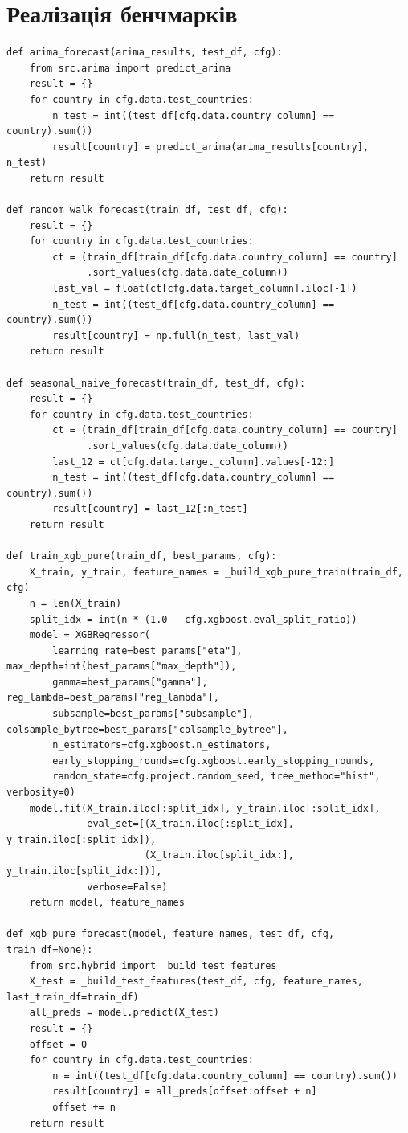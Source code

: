 \documentclass{bachelor_thesis}
\begin{document}
\section{Реалізація бенчмарків}
\label{sec:appendix_benchmarks}
\begin{lstlisting}[caption={Прогнози бенчмарків: випадкове блукання, сезонна наїва модель, XGBoost}]
def arima_forecast(arima_results, test_df, cfg):
    from src.arima import predict_arima
    result = {}
    for country in cfg.data.test_countries:
        n_test = int((test_df[cfg.data.country_column] == country).sum())
        result[country] = predict_arima(arima_results[country], n_test)
    return result

def random_walk_forecast(train_df, test_df, cfg):
    result = {}
    for country in cfg.data.test_countries:
        ct = (train_df[train_df[cfg.data.country_column] == country]
              .sort_values(cfg.data.date_column))
        last_val = float(ct[cfg.data.target_column].iloc[-1])
        n_test = int((test_df[cfg.data.country_column] == country).sum())
        result[country] = np.full(n_test, last_val)
    return result

def seasonal_naive_forecast(train_df, test_df, cfg):
    result = {}
    for country in cfg.data.test_countries:
        ct = (train_df[train_df[cfg.data.country_column] == country]
              .sort_values(cfg.data.date_column))
        last_12 = ct[cfg.data.target_column].values[-12:]
        n_test = int((test_df[cfg.data.country_column] == country).sum())
        result[country] = last_12[:n_test]
    return result

def train_xgb_pure(train_df, best_params, cfg):
    X_train, y_train, feature_names = _build_xgb_pure_train(train_df, cfg)
    n = len(X_train)
    split_idx = int(n * (1.0 - cfg.xgboost.eval_split_ratio))
    model = XGBRegressor(
        learning_rate=best_params["eta"], max_depth=int(best_params["max_depth"]),
        gamma=best_params["gamma"], reg_lambda=best_params["reg_lambda"],
        subsample=best_params["subsample"], colsample_bytree=best_params["colsample_bytree"],
        n_estimators=cfg.xgboost.n_estimators,
        early_stopping_rounds=cfg.xgboost.early_stopping_rounds,
        random_state=cfg.project.random_seed, tree_method="hist", verbosity=0)
    model.fit(X_train.iloc[:split_idx], y_train.iloc[:split_idx],
              eval_set=[(X_train.iloc[:split_idx], y_train.iloc[:split_idx]),
                        (X_train.iloc[split_idx:], y_train.iloc[split_idx:])],
              verbose=False)
    return model, feature_names

def xgb_pure_forecast(model, feature_names, test_df, cfg, train_df=None):
    from src.hybrid import _build_test_features
    X_test = _build_test_features(test_df, cfg, feature_names, last_train_df=train_df)
    all_preds = model.predict(X_test)
    result = {}
    offset = 0
    for country in cfg.data.test_countries:
        n = int((test_df[cfg.data.country_column] == country).sum())
        result[country] = all_preds[offset:offset + n]
        offset += n
    return result
\end{lstlisting}
\end{document}
